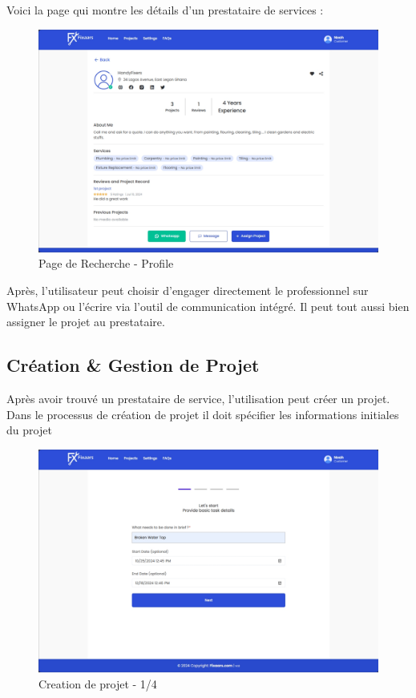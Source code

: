 Voici la page qui montre les détails d'un prestataire de services :

\vspace{0.35cm}
\begin{figure}[H]
\begin{center}
\includegraphics[width=12cm]{assets/demo/search-profile.png}
\end{center}
\caption{Page de Recherche - Profile}
\end{figure}

Après, l'utilisateur peut choisir d'engager directement le professionnel sur WhatsApp ou l'écrire via l'outil de communication intégré. Il peut tout aussi bien assigner le projet au prestataire. 


\subsection{Création \& Gestion de Projet}

Après avoir trouvé un prestataire de service, l'utilisation peut créer un projet. Dans le processus de création de projet il doit spécifier les informations initiales du projet 


\vspace{0.35cm}
\begin{figure}[H]
\begin{center}
\includegraphics[width=12cm]{assets/demo/setup-1.png}
\end{center}
\caption{Creation de projet - 1/4}
\end{figure}

